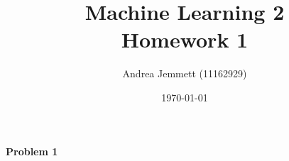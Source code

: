 \documentclass[a4paper]{article}
\title{Machine Learning 2 \\ Homework 1}
\author{Andrea Jemmett (11162929)}
\date{\today}
\begin{document}
\maketitle


\paragraph{Problem 1}
\end{document}
